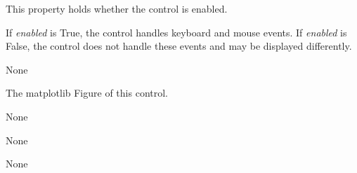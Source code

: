 \documentclass[letterpaper,10pt,english]{sphinxmanual}
\begin{document}
\begin{fulllineitems}

\begin{fulllineitems}
\label{api:mpl.Canvas.enabled}
This property holds whether the control is enabled.

If \emph{enabled} is True, the control handles keyboard and mouse events.
If \emph{enabled} is False, the control does not handle these events and may
be displayed differently.

\end{fulllineitems}


\begin{fulllineitems}
\label{api:mpl.Canvas.events_length}
None

\end{fulllineitems}


\begin{fulllineitems}
\label{api:mpl.Canvas.figure}
The matplotlib Figure of this control.

\end{fulllineitems}


\begin{fulllineitems}
\label{api:mpl.Canvas.figure_enter_action}
None

\end{fulllineitems}


\begin{fulllineitems}
\label{api:mpl.Canvas.figure_leave_action}
None

\end{fulllineitems}


\begin{fulllineitems}
\label{api:mpl.Canvas.key_press_action}
None

\end{fulllineitems}


\end{fulllineitems}
\end{document}
